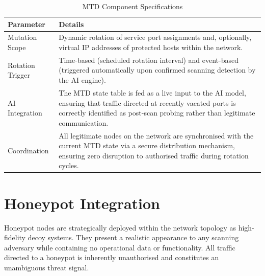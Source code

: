 \documentclass[12pt,a4paper]{report}
\begin{document}
\begin{table}[h!]
\centering
\caption{MTD Component Specifications}
\begin{tabular}{@{}L{3.5cm} L{11cm}@{}}
  \toprule
  \textbf{Parameter} & \textbf{Details} \\
  \midrule
  Mutation Scope
    & Dynamic rotation of service port assignments and, optionally, virtual IP addresses
      of protected hosts within the network. \\
  \addlinespace
  Rotation Trigger
    & Time-based (scheduled rotation interval) and event-based (triggered automatically
      upon confirmed scanning detection by the AI engine). \\
  \addlinespace
  AI Integration
    & The MTD state table is fed as a live input to the AI model, ensuring that traffic
      directed at recently vacated ports is correctly identified as post-scan probing rather
      than legitimate communication. \\
  \addlinespace
  Coordination
    & All legitimate nodes on the network are synchronised with the current MTD state
      via a secure distribution mechanism, ensuring zero disruption to authorised traffic
      during rotation cycles. \\
  \bottomrule
\end{tabular}
\label{tab:mtd-specs}
\end{table}

\section{Honeypot Integration}

Honeypot nodes are strategically deployed within the network topology as high-fidelity decoy
systems. They present a realistic appearance to any scanning adversary while containing no
operational data or functionality. All traffic directed to a honeypot is inherently unauthorised
and constitutes an unambiguous threat signal.
\end{document}
